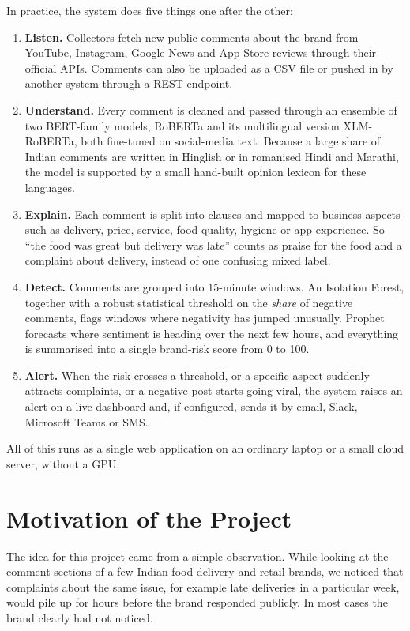 \documentclass[12pt,a4paper]{report}
\begin{document}
In practice, the system does five things one after the other:
\begin{enumerate}
    \item \textbf{Listen.} Collectors fetch new public comments about the brand from YouTube, Instagram, Google News and App Store reviews through their official APIs. Comments can also be uploaded as a CSV file or pushed in by another system through a REST endpoint.
    \item \textbf{Understand.} Every comment is cleaned and passed through an ensemble of two BERT-family models, RoBERTa and its multilingual version XLM-RoBERTa, both fine-tuned on social-media text. Because a large share of Indian comments are written in Hinglish or in romanised Hindi and Marathi, the model is supported by a small hand-built opinion lexicon for these languages.
    \item \textbf{Explain.} Each comment is split into clauses and mapped to business aspects such as delivery, price, service, food quality, hygiene or app experience. So ``the food was great but delivery was late'' counts as praise for the food and a complaint about delivery, instead of one confusing mixed label.
    \item \textbf{Detect.} Comments are grouped into 15-minute windows. An Isolation Forest, together with a robust statistical threshold on the \textit{share} of negative comments, flags windows where negativity has jumped unusually. Prophet forecasts where sentiment is heading over the next few hours, and everything is summarised into a single brand-risk score from 0 to 100.
    \item \textbf{Alert.} When the risk crosses a threshold, or a specific aspect suddenly attracts complaints, or a negative post starts going viral, the system raises an alert on a live dashboard and, if configured, sends it by email, Slack, Microsoft Teams or SMS.
\end{enumerate}

All of this runs as a single web application on an ordinary laptop or a small cloud server, without a GPU.

\section{Motivation of the Project}

The idea for this project came from a simple observation. While looking at the comment sections of a few Indian food delivery and retail brands, we noticed that complaints about the same issue, for example late deliveries in a particular week, would pile up for hours before the brand responded publicly. In most cases the brand clearly had not noticed.
\end{document}
